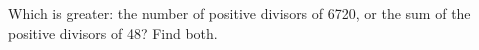 Which is greater: the number of positive divisors of 6720, or the sum of the positive divisors of 48? Find both.
